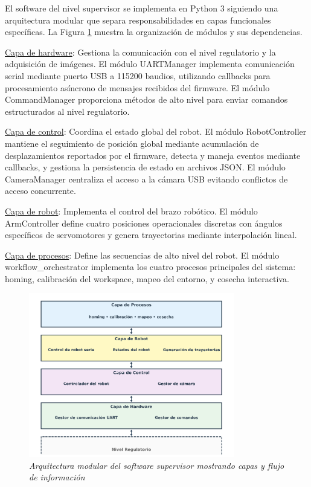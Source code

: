 El software del nivel supervisor se implementa en Python 3 siguiendo una arquitectura modular que separa responsabilidades en capas funcionales específicas. La Figura \ref{fig:arquitectura_modulos_supervisor} muestra la organización de módulos y sus dependencias.

\underline{Capa de hardware}: Gestiona la comunicación con el nivel regulatorio y la adquisición de imágenes. El módulo UARTManager implementa comunicación serial mediante puerto USB a 115200 baudios, utilizando callbacks para procesamiento asíncrono de mensajes recibidos del firmware. El módulo CommandManager proporciona métodos de alto nivel para enviar comandos estructurados al nivel regulatorio.

\underline{Capa de control}: Coordina el estado global del robot. El módulo RobotController mantiene el seguimiento de posición global mediante acumulación de desplazamientos reportados por el firmware, detecta y maneja eventos mediante callbacks, y gestiona la persistencia de estado en archivos JSON. El módulo CameraManager centraliza el acceso a la cámara USB evitando conflictos de acceso concurrente.

\underline{Capa de robot}: Implementa el control del brazo robótico. El módulo ArmController define cuatro posiciones operacionales discretas con ángulos específicos de servomotores y genera trayectorias mediante interpolación lineal.

\underline{Capa de procesos}: Define las secuencias de alto nivel del robot. El módulo workflow\_orchestrator implementa los cuatro procesos principales del sistema: homing, calibración del workspace, mapeo del entorno, y cosecha interactiva.

\begin{figure}[H]
    \centering
    \includegraphics[width=0.8\textwidth]{imagenes/arquitectura_modulos_supervisor.png}
    \caption{\textit{Arquitectura modular del software supervisor mostrando capas y flujo de información}}
    \label{fig:arquitectura_modulos_supervisor}
\end{figure}